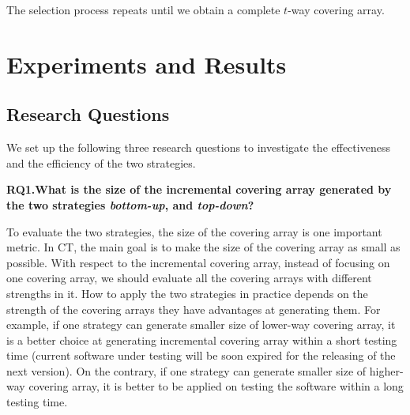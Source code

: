 \documentclass[conference]{IEEEtran}
\theoremstyle{definition}
\begin{document}
The selection process repeats until we obtain a complete $t$-way covering array.




\section{Experiments and Results}
\subsection{Research Questions}
We set up the following three research questions to investigate the effectiveness and the efficiency of the two strategies.

\textbf{RQ1.What is the size of the incremental covering array generated by the two strategies \emph{bottom-up}, and \emph{top-down}?}

To evaluate the two strategies, the size of the covering array is one important metric. In CT, the main goal is to make the size of the covering array as small as possible. With respect to the incremental covering array, instead of focusing on one covering array, we should evaluate all the covering arrays with different strengths in it. How to apply the two strategies in practice depends on the strength of the covering arrays they have advantages at generating them. For example, if one strategy can generate smaller size of lower-way covering array, it is a better choice at generating incremental covering array within a short testing time (current software under testing will be soon expired for the releasing of the next version). On the contrary, if one strategy can generate smaller size of higher-way covering array, it is better to be applied on testing the software within a long testing time.
\end{document}
